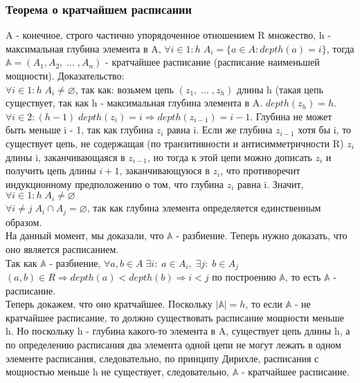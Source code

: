 \subsubsection{Теорема о кратчайшем расписании}
A - конечное, строго частично упорядоченное отношением R множество, h - максимальная глубина элемента в A, $\forall i \in 1:h \; A_i = \{a \in A: depth(a) = i\}$, тогда $\mathbb{A} = (A_1, A_2, \; ... \;, A_n)$ - кратчайшее расписание (расписание наименьшей мощности). Доказательство: \\
$\forall i \in 1:h \; A_i \not= \varnothing$, так как: возьмем цепь $(z_1, \; ... \; , z_h)$ длины h (такая цепь существует, так как h - максимальная глубина элемента в A. $depth(z_h) = h$. $\forall i \in 2:(h-1) \;depth(z_i) = i \Rightarrow depth(z_{i - 1}) = i - 1$. Глубина не может быть меньше i - 1, так как глубина $z_i$ равна i. Если же глубина $z_{i - 1}$ хотя бы i, то существует цепь, не содержащая (по транзитивности и антисимметричности R) $z_i$ длины i, заканчивающаяся в $z_{i - 1}$, но тогда к этой цепи можно дописать $z_i$ и получить цепь длины $i + 1$, заканчивающуюся в $z_i$, что противоречит индукционному предположению о том, что глубина $z_i$ равна i. Значит, $\forall i \in 1:h \; A_i \not= \varnothing$ \\
$\forall i \not= j \; A_i \cap A_j = \varnothing$, так как глубина элемента определяется единственным образом. \\
На данный момент, мы доказали, что $\mathbb{A}$ - разбиение. Теперь нужно доказать, что оно является расписанием. \\
Так как $\mathbb{A}$ - разбиение, $\forall a, b \in A \; \exists i : \; a \in A_i, \; \exists j : \; b \in A_j$ \\
$(a, b) \in R \Rightarrow depth(a) < depth(b) \Rightarrow i < j$ по построению $\mathbb{A}$, то есть $\mathbb{A}$ - расписание.\\
Теперь докажем, что оно кратчайшее. Поскольку $|\mathbb{A}| = h$, то если $\mathbb{A}$ - не кратчайшее расписание, то должно существовать расписание мощности меньше h. Но поскольку h - глубина какого-то элемента в A, существует цепь длины h, а по определению расписания два элемента одной цепи не могут лежать в одном элементе расписания, следовательно, по принципу Дирихле, расписания с мощностью меньше h не существует, следовательно, $\mathbb{A}$ - кратчайшее расписание.